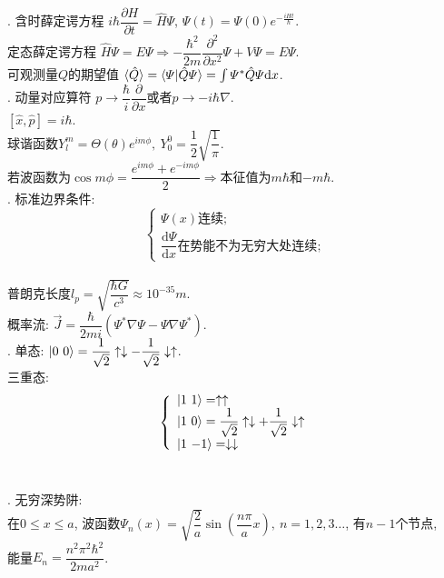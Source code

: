 \documentclass[12pt, 
]{article}
\begin{document}
. 含时薛定谔方程 $i\hbar\dfrac{\partial H}{\partial t}=\hat{H}\varPsi$, $\varPsi(t)=\varPsi(0)e^{-\frac{iHt}{\hbar}}$.
~\\\phantom{~~~~}定态薛定谔方程 $\hat{H}\varPsi=E\varPsi\Rightarrow-\dfrac{\hbar^2}{2m}\dfrac{\partial^2}{\partial x^2}\varPsi+V\varPsi=E\varPsi$.
~\\\phantom{~~~~}可观测量$Q$的期望值 $\braket{\hat{Q}}=\braket{\varPsi|\hat{Q}\varPsi}=\int\varPsi^*\hat{Q}\varPsi\mathrm{d}x$.
~\\

. 动量对应算符 $p\rightarrow\dfrac{\hbar}{i}\dfrac{\partial}{\partial x}$或者$p\rightarrow-i\hbar\nabla$.
~\\\phantom{~~~~}$[\hat{x},\hat{p}]=i\hbar$.
~\\\phantom{~~~~}球谐函数$Y_l^m=\varTheta(\theta)e^{im\phi},~Y_0^0=\dfrac{1}{2}\sqrt{\dfrac{1}{\pi}}$.
~\\\phantom{~~~~}若波函数为$\cos m\phi=\dfrac{e^{im\phi}+e^{-im\phi}}{2}\Rightarrow$本征值为$m\hbar$和$-m\hbar$.
~\\

. 标准边界条件:
\[
	\left\{
	\begin{array}{l}
		\varPsi(x)\text{连续};\\
		\dfrac{\mathrm{d}\varPsi}{\mathrm{d}x}\text{在势能不为无穷大处连续};
	\end{array}
	\right.
\]
~\\\phantom{~~~~}普朗克长度$l_p=\sqrt{\dfrac{\hbar G}{c^3}}\approx10^{-35}m$.
~\\\phantom{~~~~}概率流: $\vec{J}=\dfrac{\hbar}{2mi}(\varPsi^*\nabla\varPsi-\varPsi\nabla\varPsi^*)$.
~\\

. 单态: $\ket{0~0}=\dfrac{1}{\sqrt{2}}\uparrow\downarrow-\dfrac{1}{\sqrt{2}}\downarrow\uparrow$.
~\\\phantom{~~~~}三重态:
\[
	\left\{
	\begin{array}{l}
		\ket{1~1}=\uparrow\uparrow\\
		\ket{1~0}=\dfrac{1}{\sqrt{2}}\uparrow\downarrow+\dfrac{1}{\sqrt{2}}\downarrow\uparrow\\
		\ket{1~{-1}}=\downarrow\downarrow
	\end{array}
	\right.
\]
~\\

. 无穷深势阱:
~\\\phantom{~~~~~~}在$0\leqslant x\leqslant a$, 波函数$\varPsi_n(x)=\sqrt{\dfrac{2}{a}}\sin(\dfrac{n\pi}{a}x),~n=1,2,3\dots$, 有$n-1$个节点, 
~\\\phantom{~~~~~~}能量$E_n=\dfrac{n^2\pi^2\hbar^2}{2ma^2}$.
~\\
\end{document}
